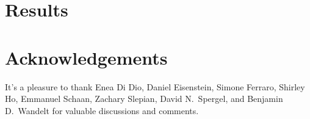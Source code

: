 \documentclass[12pt, letterpaper, preprint]{aastex62}
\begin{document}





 

\section{Results} \label{sec:results} 
 
 

 

\section*{Acknowledgements}
It's a pleasure to thank 
    Enea Di Dio, 
    Daniel Eisenstein, 
    Simone Ferraro, 
    Shirley Ho, 
    Emmanuel Schaan, 
    Zachary Slepian, 
    David N.~Spergel, 
    and Benjamin D.~Wandelt
    for valuable discussions and comments. 

\appendix
 



 
\end{document}
